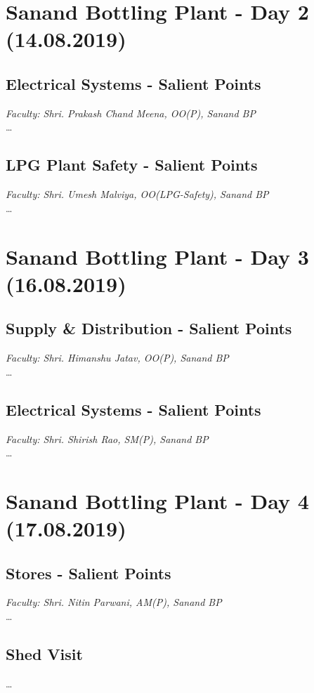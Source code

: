 \documentclass{report}
\begin{document}
	\section{Sanand Bottling Plant - Day 2 (14.08.2019)}
	\subsection{Electrical Systems - Salient Points}
	\textit{Faculty: Shri. Prakash Chand Meena, OO(P), Sanand BP}\\
	\ldots
	
	\subsection{LPG Plant Safety - Salient Points}
	\textit{Faculty: Shri. Umesh Malviya, OO(LPG-Safety), Sanand BP}\\
	\ldots
	
	\section{Sanand Bottling Plant - Day 3 (16.08.2019)}
	
	\subsection{Supply \& Distribution - Salient Points}
	\textit{Faculty: Shri. Himanshu Jatav, OO(P), Sanand BP}\\
	\ldots
	
	\subsection{Electrical Systems - Salient Points}
	\textit{Faculty: Shri. Shirish Rao, SM(P), Sanand BP}\\
	\ldots
	
	\section{Sanand Bottling Plant - Day 4 (17.08.2019)}
	\subsection{Stores - Salient Points}
	\textit{Faculty: Shri. Nitin Parwani, AM(P), Sanand BP}\\
	\ldots
	
	\subsection{Shed Visit}
	\ldots
	
\end{document}
